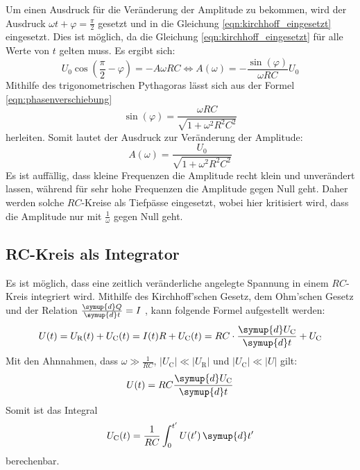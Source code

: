     \noindent Um einen Ausdruck für die Veränderung der Amplitude zu bekommen, wird der Ausdruck $\omega t + \varphi = \frac{\pi}{2}$ gesetzt und in die Gleichung
    \eqref{eqn:kirchhoff_eingesetzt} eingesetzt. Dies ist möglich, da die Gleichung \eqref{eqn:kirchhoff_eingesetzt} für alle Werte von $t$ gelten muss.
    Es ergibt sich:
    \begin{equation*}
        U_0 \cos(\frac{\pi}{2} - \varphi) = -A \omega RC  \iff A(\omega) = - \frac{\sin(\varphi)}{\omega RC }U_0
    \end{equation*}
    Mithilfe des trigonometrischen Pythagoras lässt sich aus der Formel \eqref{eqn:phasenverschiebung} 
    \begin{equation*}
        \sin(\varphi) = \frac{\omega RC}{\sqrt{1 + \omega^2 R^2 C^2}}
    \end{equation*}
    herleiten. Somit lautet der Ausdruck zur Veränderung der Amplitude:
    \begin{equation} \label{eqn:amplitude}
        A(\omega) = \frac{U_0}{\sqrt{1 + \omega^2 R^2 C^2}}
    \end{equation}
    Es ist auffällig, dass kleine Frequenzen die Amplitude recht klein und unverändert lassen, während für sehr hohe Frequenzen die Amplitude gegen Null geht. 
    Daher werden solche $RC$-Kreise als Tiefpässe eingesetzt, wobei hier kritisiert wird, dass die Amplitude nur mit $\frac{1}{ \omega}$ gegen Null geht.


\subsection{RC-Kreis als Integrator}

    Es ist möglich, dass eine zeitlich veränderliche  angelegte Spannung in einem $RC$-Kreis integriert wird. Mithilfe des Kirchhoff'schen Gesetz, dem Ohm'schen 
    Gesetz und der Relation $\frac{\symup{d}Q}{\symup{d}t} = I$ , kann folgende Formel aufgestellt werden:
    \begin{equation*}
        U(t) = U_{\text{R}}(t) + U_{\text{C}}(t) = I(t)R + U_{\text{C}}(t) = RC \cdot \frac{\symup{d}U_{\text{C}}}{\symup{d}t} + U_{\text{C}} 
    \end{equation*}
    Mit den Ahnnahmen, dass $\omega \gg \frac{1}{RC}$, $|U_{\text{C}}| \ll |U_{\text{R}}|$ und $|U_{\text{C}}| \ll |U| $ gilt:
    \begin{equation*}
        U(t) = RC \frac{\symup{d}U_{\text{C}}}{\symup{d}t}
    \end{equation*}
    Somit ist das Integral 
    \begin{equation*}
        U_{\text{C}} (t) = \frac{1}{RC} \int_0^{t'} U(t') \, \symup{d}t'
    \end{equation*}
    berechenbar. 